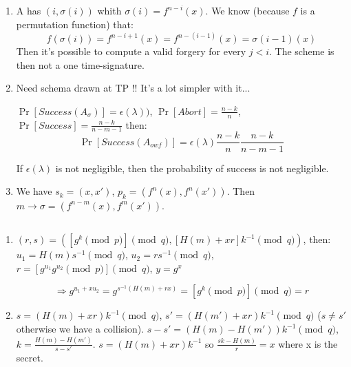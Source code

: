 \subsection{}
\begin{solution}
  \begin{enumerate}
    \item
      A has $(i, \sigma(i))$ whith $\sigma (i) = f^{n-i} (x)$. We know (because $f$ is a permutation function) that:
      $$f(\sigma(i)) = f^{n-i+1}(x) = f^{n-(i-1)}(x) = \sigma(i-1)(x)$$
      Then it's possible to compute a valid forgery for every $j < i$. The scheme is then not a one time-signature.
    \item
      Need schema drawn at TP !! It's a lot simpler with it...

      $\Pr[Success (A_\sigma)] = \epsilon(\lambda))$, $\Pr[Abort] = \frac{n-k}{n}$, $\Pr[Success] = \frac{n-k}{n-m-1}$ then:
      $$ \Pr[Success(A_{owf})] = \epsilon(\lambda) \frac{n-k}{n} \frac{n-k}{n-m-1}$$

      If $\epsilon(\lambda)$ is not negligible, then the probability of success is not negligible.
    \item
      We have $s_k = (x, x')$, $p_k = (f^n(x), f^n(x'))$.
      Then $m \rightarrow \sigma = (f^{n-m}(x), f^m(x'))$.

  \end{enumerate}
\end{solution}

\subsection{}
\begin{solution}
  \begin{enumerate}
    \item
      $(r, s) = ([g^k \pmod{p}] \pmod{q}, [H(m) + xr]k^{-1} \pmod{q})$, then:
      $u_1 = H(m)s^{-1} \pmod{q}$,  $u_2 = rs^{-1} \pmod{q}$, $r = [g^{u_1} g^{u_2} \pmod{p}] \pmod{q}$, $y = g^x$

      $$\Rightarrow g^{u_1 + xu_2} = g^{s^{-1}(H(m) + rx)} = [g^k \pmod{p}] \pmod{q} = r$$
    \item
      $s = (H(m) + xr)k^{-1} \pmod{q}$, $s' = (H(m') + xr)k^{-1} \pmod{q}$ ($s \neq s'$ otherwise we have a collision).
      $s - s' = (H(m) - H(m'))k^{-1} \pmod{q}$, $k = \frac{H(m) - H(m')}{s - s'}$.
      $s = (H(m) + xr)k^{-1}$ so $\frac{sk - H(m)}{r} = x$ where x is the secret.
  \end{enumerate}
\end{solution}

